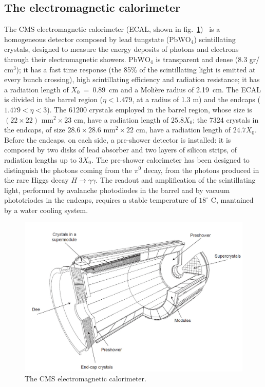 \subsection{The electromagnetic calorimeter}
The CMS electromagnetic calorimeter (ECAL, shown in fig.~\ref{fig:CMS_ecal})~\cite{ECAL-TDR} is a homogeneous detector composed by lead tungstate ($\text{PbWO}_4$) scintillating crystals, designed to measure the energy deposits of photons and electrons through their electromagnetic showers. $\text{PbWO}_4$ is transparent and dense (8.3 gr/$\text{cm}^3$); it has a fast time response (the 85\% of the scintillating light is emitted at every bunch crossing), high scintillating efficiency and radiation resistance; it has a radiation length of $X_0~=~0.89$~cm and a Moli\`ere radius of 2.19~cm. The ECAL is divided in the barrel region ($\eta < 1.479$, at a radius of 1.3 m) and the endcaps ($1.479 < \eta < 3$).  The 61200 crystals employed in the barrel region, whose size is $(22 \times 22) \text{ mm}^2 \times 23 \text{ cm}$, have a radiation length of $25.8 X_0$; the 7324 crystals in the endcaps, of size $ 28.6 \times 28.6 \text{ mm}^2 \times 22 \text{ cm}$, have a radiation length of $24.7 X_0$. Before the endcaps, on each side, a pre-shower detector is installed: it is composed by two disks of lead absorber and two layers of silicon strips, of radiation lengths up to $3X_0$. The pre-shower calorimeter has been designed to distinguish the photons coming from the $\pi^0$ decay, from the photons produced in the rare Higgs decay $H \rightarrow \gamma \gamma$. The readout and amplification of the scintillating light, performed by avalanche photodiodes in the barrel and by vacuum phototriodes in the endcaps, requires a stable temperature of $18^{\circ}$ C, mantained by a water cooling system.

\begin{figure}[!htb]
  \centering
    \includegraphics[width=.7\textwidth]{figures/cmsecal.png}
  \caption{The CMS electromagnetic calorimeter.~\cite{Chatrchyan:2008zzk}}
  \label{fig:CMS_ecal}
\end{figure}

